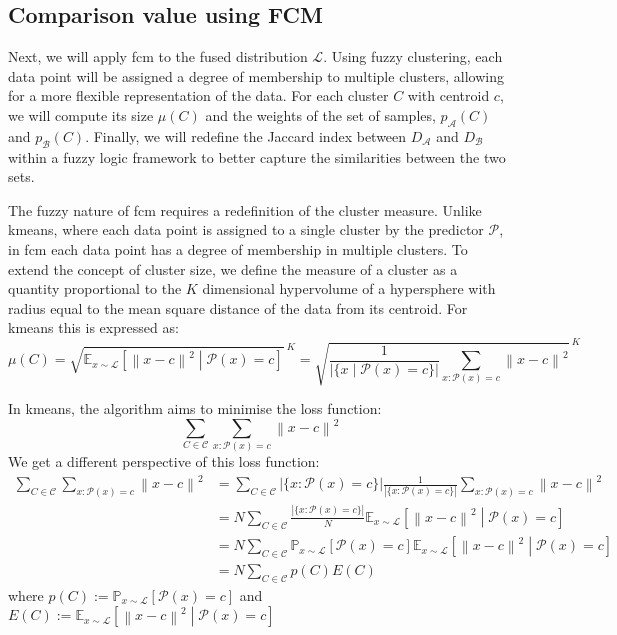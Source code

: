 \subsection{Comparison value using FCM}
\begin{modified}
\noindent Next, we will apply \gls{fcm} to the fused distribution $\mathcal{L}$. Using fuzzy clustering, each data point will be assigned a degree of membership to multiple clusters, allowing for a more flexible representation of the data. For each cluster $C$ with centroid $c$, we will compute its size $\mu(C)$ and the weights of the set of samples, $p_\mathcal{A}(C)$ and $p_\mathcal{B}(C)$. Finally, we will redefine the Jaccard index between $D_\mathcal{A}$ and $D_\mathcal{B}$ within a fuzzy logic framework to better capture the similarities between the two sets.

\noindent The fuzzy nature of \gls{fcm} requires a redefinition of the cluster measure. Unlike \gls{kmeans}, where each data point is assigned to a single cluster by the predictor $\mathcal{P}$, in \gls{fcm} each data point has a degree of membership in multiple clusters. To extend the concept of cluster size, we define the measure of a cluster as a quantity proportional to the $K$ dimensional hypervolume of a hypersphere with radius equal to the mean square distance of the data from its centroid. For \gls{kmeans} this is expressed as:
\begin{equation*}
	\mu(C) = {\sqrt{\mathbb{E}_{x\sim\mathcal{L}}\left[\left\|x-c\right\|^2\middle|\mathcal{P}(x)=c\right]}\,}^{K} = {\sqrt{\frac{1}{\left|\{x\middle|\mathcal{P}(x)=c\}\right|}\sum_{x:\mathcal{P}(x)=c}\left\|x-c\right\|^2}\,}^{K}
\end{equation*}

\noindent In \gls{kmeans}, the algorithm aims to minimise the loss function:
\[
	\sum_{C\in\mathcal{C}}\sum_{x:\mathcal{P}(x)=c}\left\|x-c\right\|^2
\]
We get a different perspective of this loss function:
\begin{align*}
	\sum_{C\in\mathcal{C}}\sum_{x:\mathcal{P}(x)=c}\left\|x-c\right\|^2 &= \sum_{C\in\mathcal{C}}\left|\{x:\mathcal{P}(x)=c\}\right|\frac{1}{\left|\{x:\mathcal{P}(x)=c\}\right|}\sum_{x:\mathcal{P}(x)=c}\left\|x-c\right\|^2 \\
	&= N\sum_{C\in\mathcal{C}}\frac{\left|\{x:\mathcal{P}(x)=c\}\right|}{N}\mathbb{E}_{x\sim\mathcal{L}}\left[\left\|x-c\right\|^2\middle|\mathcal{P}(x)=c\right] \\
	&= N\sum_{C\in\mathcal{C}}\mathbb{P}_{x\sim\mathcal{L}}\left[\mathcal{P}(x)=c\right]\mathbb{E}_{x\sim\mathcal{L}}\left[\left\|x-c\right\|^2\middle|\mathcal{P}(x)=c\right] \\
	&= N\sum_{C\in\mathcal{C}} p(C)E(C)
\end{align*}
where $p(C):= \mathbb{P}_{x\sim\mathcal{L}}\left[\mathcal{P}(x)=c\right]$ and $E(C):= \mathbb{E}_{x\sim\mathcal{L}}\left[\left\|x-c\right\|^2\middle|\mathcal{P}(x)=c\right]$


\end{modified}
